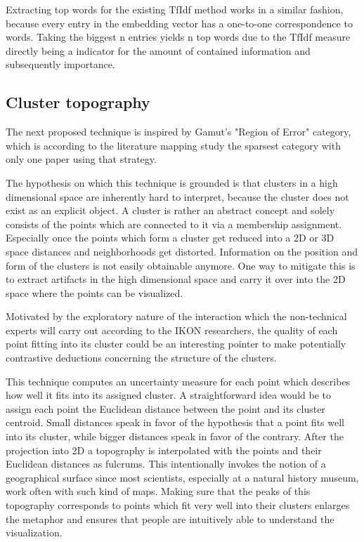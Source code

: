 Extracting top words for the existing TfIdf method works in a similar fashion, because every entry in the embedding vector has a one-to-one correspondence to words. Taking the biggest n entries yields n top words due to the TfIdf measure directly being a indicator for the amount of contained information and subsequently importance.

\subsection{Cluster topography }

The next proposed technique is inspired by Gamut's "Region of Error" category, which is according to the literature mapping study the sparsest category with only one paper using that strategy.

The hypothesis on which this technique is grounded is that clusters in a high dimensional space are inherently hard to interpret, because the cluster does not exist as an explicit object. A cluster is rather an abstract concept and solely consists of the points which are connected to it via a membership assignment. Especially once the points which form a cluster get reduced into a 2D or 3D space distances and neighborhoods get distorted. Information on the position and form of the clusters is not easily obtainable anymore. One way to mitigate this is to extract artifacts in the high dimensional space and carry it over into the 2D space where the points can be visualized.

Motivated by the exploratory nature of the interaction which the non-technical experts will carry out according to the IKON researchers, the quality of each point fitting into its cluster could be an interesting pointer to make potentially contrastive deductions concerning the structure of the clusters.

This technique computes an uncertainty measure for each point which describes how well it fits into its assigned cluster. A straightforward idea would be to assign each point the Euclidean distance between the point and its cluster centroid. Small distances speak in favor of the hypothesis that a point fits well into its cluster, while bigger distances speak in favor of the contrary. After the projection into 2D a topography is interpolated with the points and their Euclidean distances as fulcrums. This intentionally invokes the notion of a geographical surface since most scientists, especially at a natural history museum, work often with such kind of maps. Making sure that the peaks of this topography corresponds to points which fit very well into their clusters enlarges the metaphor and ensures that people are intuitively able to understand the visualization. 

